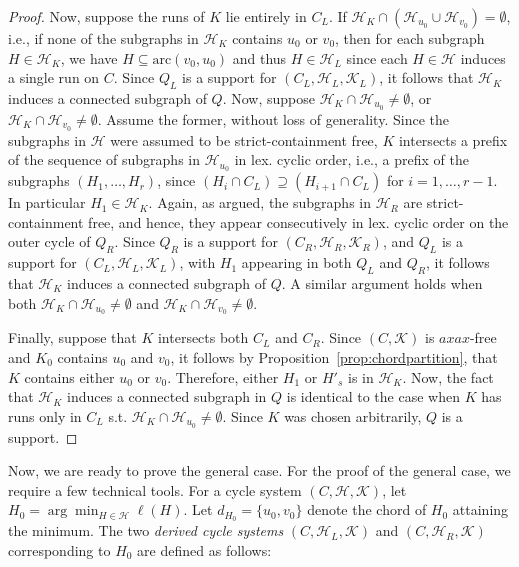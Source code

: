 \documentclass[12pt]{article}
\newcommand{\HH}{\mathcal{H}}
\newcommand{\KK}{\mathcal{K}}
\newcommand{\arc}{\mathrm{arc}}
\theoremstyle{case}
\begin{document}
\begin{proof}
Now, suppose the runs of $K$ lie entirely in $C_L$. 
If $\mathcal{H}_K\cap(\mathcal{H}_{u_0}\cup\mathcal{H}_{v_0})=\emptyset$, i.e., if none of the subgraphs in $\HH_K$ contains $u_0$ or $v_0$, then for each subgraph $H\in\HH_K$, we have $H\subseteq \arc(v_0,u_0)$ and thus $H\in\HH_L$ 
since
each $H\in\mathcal{H}$ induces a single run on $C$. 
Since $Q_L$ is a support for $(C_L,\HH_L,\KK_L)$, it follows that
$\mathcal{H}_K$ induces a connected subgraph of $Q$. 
Now, suppose 
$\mathcal{H}_K\cap\mathcal{H}_{u_0}\neq\emptyset$, or $\mathcal{H}_K\cap\mathcal{H}_{v_0}\neq\emptyset$. Assume the former, without loss
of generality. Since the subgraphs in $\mathcal{H}$ were assumed to be strict-containment free,
$K$ intersects a prefix of the sequence of subgraphs in $\mathcal{H}_{u_0}$ in lex. cyclic order, i.e.,
a prefix of the subgraphs $(H_1, \ldots, H_r)$, since
$(H_i\cap C_L)\supseteq (H_{i+1}\cap C_L)$ for $i=1,\ldots, r-1$. 
In particular $H_1\in\mathcal{H}_K$.
Again, as argued, the subgraphs in $\mathcal{H}_R$ are strict-containment free, and hence, they appear consecutively
in lex. cyclic order on the outer cycle of $Q_R$. 
Since $Q_R$ is a support for $(C_R,\mathcal{H}_R,\mathcal{K}_R)$, and $Q_L$ is a support for $(C_L,\mathcal{H}_L,\mathcal{K}_L)$, with $H_1$
appearing in both $Q_L$ and $Q_R$, it follows that $\mathcal{H}_K$ induces a connected subgraph of $Q$.
A similar argument holds when both $\mathcal{H}_K\cap\mathcal{H}_{u_0}\neq\emptyset$ and $\mathcal{H}_K\cap\mathcal{H}_{v_0}\neq\emptyset$.

Finally, suppose that $K$ intersects both $C_L$ and $C_R$.
Since $(C,\mathcal{K})$ is $axax$-free and $K_0$ contains $u_0$ and $v_0$, it follows by Proposition~\ref{prop:chordpartition}, that
$K$ contains either $u_0$ or $v_0$. Therefore,
either $H_1$ or $H'_s$ is in $\mathcal{H}_K$. Now, the
fact that $\mathcal{H}_K$ induces a connected subgraph in $Q$
is identical to the case when $K$ has runs only in $C_L$ s.t. $\mathcal{H}_K\cap\mathcal{H}_{u_0}\neq\emptyset$.
Since $K$ was chosen arbitrarily, $Q$ is a support.
\end{proof}

Now, we are ready to prove the general case.
For the proof of the general case, we require a few technical tools.
For a cycle system $(C,\mathcal{H},\mathcal{K})$, let
$H_0=\arg\min_{H\in\mathcal{H}}\ell(H)$. Let $d_{H_0}=\{u_0,v_0\}$ denote
the chord of $H_0$ attaining the minimum.
The two \emph{derived cycle systems}
$(C,\mathcal{H}_L,\mathcal{K})$ and $(C,\mathcal{H}_R,\mathcal{K})$
corresponding to $H_0$ are defined as follows:
\end{document}
